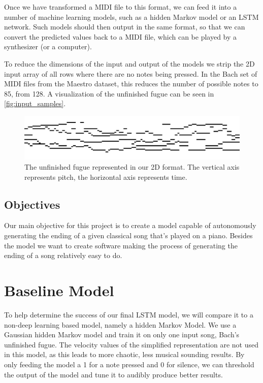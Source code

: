 \documentclass[11pt, twocolumn]{article}
\begin{document}
Once we have transformed a MIDI file to this format, we can feed it into a number of machine learning models, such as a hidden Markov model or an LSTM network. Such models should then output in the same format, so that we can convert the predicted values back to a MIDI file, which can be played by a synthesizer (or a computer).

To reduce the dimensions of the input and output of the models we strip the 2D input array of all rows where there are no notes being pressed. In the Bach set of MIDI files from the Maestro dataset, this reduces the number of possible notes to 85, from 128. A visualization of the unfinished fugue can be seen in \autoref{fig:input_samples}.


\begin{figure}
    \centering
    \includegraphics[width=\linewidth]{images/unfin_array.png}
    \caption{The unfinished fugue represented in our 2D format. The vertical axis represents pitch, the horizontal axis represents time.}
    \label{fig:input_samples}
\end{figure}
    
\subsection{Objectives}
Our main objective for this project is to create a model capable of autonomously generating the ending of a given classical song that's played on a piano. Besides the model we want to create software making the process of generating the ending of a song relatively easy to do.

\section{Baseline Model}
To help determine the success of our final LSTM model, we will compare it to a non-deep learning based model, namely a hidden Markov Model. We use a Gaussian hidden Markov model and train it on only one input song, Bach's unfinished fugue. The velocity values of the simplified representation are not used in this model, as this leads to more chaotic, less musical sounding results. By only feeding the model a 1 for a note pressed and 0 for silence, we can threshold the output of the model and tune it to audibly produce better results.
\end{document}
